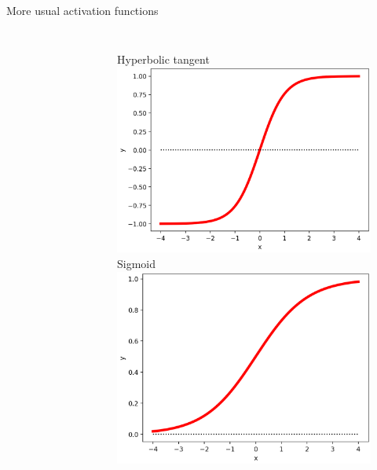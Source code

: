 \documentclass[handout]{beamer}
\begin{document}
\begin{frame}{More usual activation functions}
\begin{columns}
\begin{figure}
    \end{figure}
    \begin{figure}
     \centering
        Hyperbolic tangent\\
        \includegraphics[width=.85\textwidth]{fig/L2/activ-tanh.png}\\
       Sigmoid\\
        \includegraphics[width=.85\textwidth]{fig/L2/activ-sigmoid.png}\\

    \end{figure}
\end{columns}
\end{frame}
\end{document}
